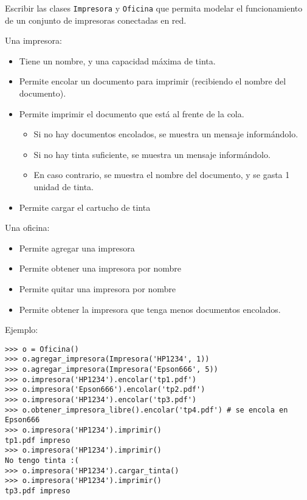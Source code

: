 \begin{ejercicio}
Escribir las clases \verb|Impresora| y \verb|Oficina| que permita
modelar el funcionamiento de un conjunto de impresoras conectadas en red.

\noindent
Una impresora:
\begin{itemize}[nosep]
\item Tiene un nombre, y una capacidad máxima de tinta.
\item Permite encolar un documento para imprimir (recibiendo el nombre del documento).
\item Permite imprimir el documento que está al frente de la cola.
	\begin{itemize}[nosep]
		\item Si no hay documentos encolados, se muestra un mensaje informándolo.
		\item Si no hay tinta suficiente, se muestra un mensaje informándolo.
		\item En caso contrario, se muestra el nombre del documento, y se gasta 1 unidad de tinta.
	\end{itemize}
\item Permite cargar el cartucho de tinta
\end{itemize}

\noindent
Una oficina:
\begin{itemize}[nosep]
\item Permite agregar una impresora
\item Permite obtener una impresora por nombre
\item Permite quitar una impresora por nombre
\item Permite obtener la impresora que tenga menos documentos encolados.
\end{itemize}

\noindent
Ejemplo:

\begin{lstlisting}[numbers=none]
>>> o = Oficina()
>>> o.agregar_impresora(Impresora('HP1234', 1))
>>> o.agregar_impresora(Impresora('Epson666', 5))
>>> o.impresora('HP1234').encolar('tp1.pdf')
>>> o.impresora('Epson666').encolar('tp2.pdf')
>>> o.impresora('HP1234').encolar('tp3.pdf')
>>> o.obtener_impresora_libre().encolar('tp4.pdf') # se encola en Epson666
>>> o.impresora('HP1234').imprimir()
tp1.pdf impreso
>>> o.impresora('HP1234').imprimir()
No tengo tinta :(
>>> o.impresora('HP1234').cargar_tinta()
>>> o.impresora('HP1234').imprimir()
tp3.pdf impreso
\end{lstlisting}
\end{ejercicio}

